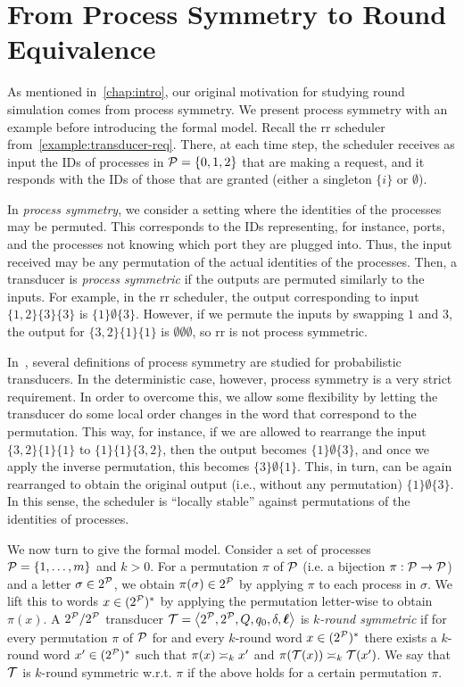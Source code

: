 \chapter{From Process Symmetry to Round Equivalence}
\label{chap:application}

As mentioned in~\cref{chap:intro}, our original motivation for studying round simulation comes from process symmetry. We present process symmetry with an example before introducing the formal model.
Recall the \gls{rr} scheduler from~\cref{example:transducer-req}. There, at each time step, the scheduler receives as input the IDs of processes in $\cP=\{0,1,2\}$ that are making a request, and it responds with the IDs of those that are granted (either a singleton $\{i\}$ or $\emptyset$).

In \emph{process symmetry}, we consider a setting where the identities of the processes may be permuted. This corresponds to the IDs representing, for instance, ports, and the processes not knowing which port they are plugged into. Thus, the input received may be any permutation of the actual identities of the processes. Then, a transducer is \emph{process symmetric} if the outputs are permuted similarly to the inputs. For example, in the \gls{rr} scheduler, the output corresponding to input $\{1,2\}\{3\}\{3\}$ is $\{1\}\emptyset\{3\}$. However, if we permute the inputs by swapping $1$ and $3$, the output for $\{3,2\}\{1\}\{1\}$ is $\emptyset\emptyset\emptyset$, so \gls{rr} is not process symmetric.

In~\cite{Almagor2020b}, several definitions of process symmetry are studied for probabilistic transducers. In the deterministic case, however, process symmetry is a very strict requirement. In order to overcome this, we allow some flexibility by letting the transducer do some local order changes in the word that correspond to the permutation. This way, for instance, if we are allowed to rearrange the input $\{3,2\}\{1\}\{1\}$ to $\{1\}\{1\}\{3,2\}$, then the output becomes $\{1\}\emptyset\{3\}$, and once we apply the inverse permutation, this becomes $\{3\}\emptyset\{1\}$. This, in turn, can be again rearranged to obtain the original output (i.e., without any permutation) $\{1\}\emptyset\{3\}$.
In this sense, the scheduler is ``locally stable'' against permutations of the identities of processes.

We now turn to give the formal model.
Consider a set of processes $\cP=\{1,\dots,m\}$ and $k>0$. For a permutation $\pi$ of $\cP$ (i.e. a bijection $\pi:\cP\to \cP$) and a letter $\sigma\in 2^{\cP}$, we obtain $\pi(\sigma)\in 2^{\cP}$ by applying $\pi$ to each process in $\sigma$. We lift this to words $x\in (2^{\cP})^*$ by applying the permutation letter-wise to obtain $\pi(x)$.
A $2^\cP/2^\cP$ transducer $\cT=\tup{2^\cP,2^\cP,Q,q_0,\delta,\lab}$ is \emph{$k$-round symmetric} if for every permutation $\pi$ of $\cP$ for and every $k$-round word $x\in (2^{\cP})^*$ there exists a $k$-round word $x' \in (2^{\cP})^*$ such that $\pi(x)\req[k] x'$ and $\pi(\cT(x))\req[k] \cT(x')$.
We say that $\cT$ is $k$-round symmetric w.r.t.\! $\pi$ if the above holds for a certain permutation $\pi$.

